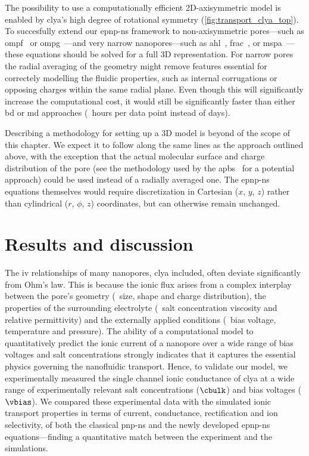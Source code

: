 The possibility to use a computationally efficient 2D-axisymmetric model is enabled by \gls{clya}'s high
degree of rotational symmetry (\cref{fig:transport_clya_top}). To succesfully extend our \gls{epnp-ns}
framework to non-axisymmetric pores---such as \gls{ompf}~\cite{Yamashita-2008} or
\gls{ompg}~\cite{Subbarao-2006}---and very narrow nanopores---such as \gls{ahl}~\cite{Song-1996},
\gls{frac}~\cite{Tanaka-2015}, or \gls{mspa}~\cite{Faller-2004}---these equations should be solved for a full
3D representation. For narrow pores the radial averaging of the geometry might remove features essential for
correctely modelling the fluidic properties, such as internal corrugations or opposing charges within the same
radial plane. Even though this will significantly increase the computational cost, it would still be
significantly faster than either \gls{bd} or \gls{md} approaches (\ie~hours per data point instead of days).

Describing a methodology for setting up a 3D model is beyond of the scope of this chapter. We expect it to
follow along the same lines as the approach outlined above, with the exception that the actual molecular
surface and charge distribution of the pore (see the methodology used by the
\gls{apbs}~\cite{Baker-2001,Jurrus-2018} for a potential approach) could be used instead of a radially
averaged one. The \gls{epnp-ns} equations themselves would require discretization in Cartesian ($x$, $y$, $z$)
rather than cylindrical ($r$, $\phi$, $z$) coordinates, but can otherwise remain unchanged.


\section{Results and discussion}
%
\label{sec:transport:results}
%

The \gls{iv} relationships of many nanopores, \gls{clya} included, often deviate significantly from Ohm's law.
This is because the ionic flux arises from a complex interplay between the pore's geometry (\eg~size, shape
and charge distribution), the properties of the surrounding electrolyte (\eg~salt concentration viscosity and
relative permittivity) and the externally applied conditions (\eg~bias voltage, temperature and pressure). The
ability of a computational model to quantitatively predict the ionic current of a nanopore over a wide range
of bias voltages and salt concentrations strongly indicates that it captures the essential physics governing
the nanofluidic transport. Hence, to validate our model, we experimentally measured the single channel ionic
conductance of \gls{clya} at a wide range of experimentally relevant salt concentrations ($\cbulk$) and bias
voltages ($\vbias$). We compared these experimental data with the simulated ionic transport properties in
terms of current, conductance, rectification and ion selectivity, of both the classical \gls{pnp-ns} and the
newly developed \gls{epnp-ns} equations---finding a quantitative match between the experiment and the
simulations.

